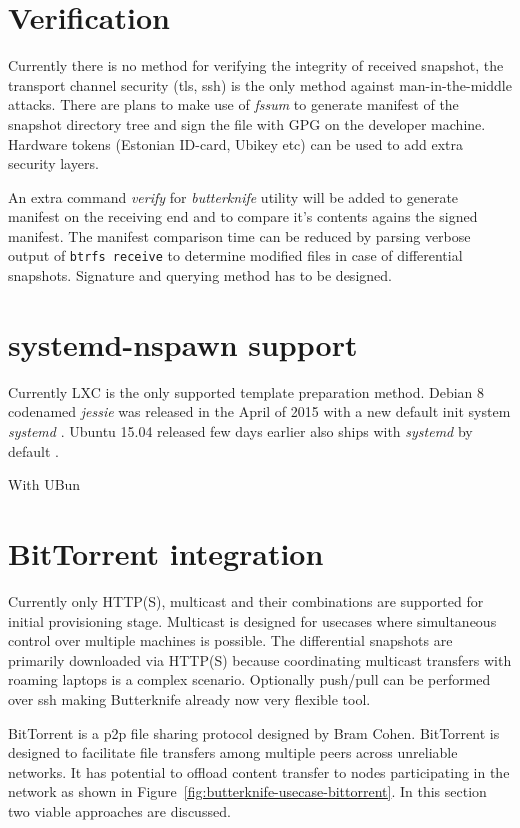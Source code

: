 \documentclass[a4paper,11pt]{kth-mag}
\begin{document}
\section{Verification}

Currently there is no method for verifying the integrity
of received snapshot, the transport channel security
(\acrshort{tls}, \acrshort{ssh}) is the only method against man-in-the-middle attacks.
There are plans to make use of \emph{fssum} to generate
manifest of the snapshot directory tree and
sign the file with GPG on the developer machine.
Hardware tokens (Estonian ID-card, Ubikey etc) can be used
to add extra security layers.

An extra command \emph{verify} for
\emph{butterknife} utility will be added
to generate manifest on the receiving end and
to compare it's contents agains the signed manifest.
The manifest comparison time can be reduced by
parsing verbose output of \lstinline!btrfs receive!
to determine modified files
in case of differential snapshots.
Signature and querying method has to be designed.

\section{systemd-nspawn support}

Currently LXC is the only supported template preparation method.
Debian 8 codenamed \emph{jessie} was released in the April of 2015
with a new default init system \emph{systemd}
\cite{debian-jessie-released}.
Ubuntu 15.04 released few days earlier also
ships with \emph{systemd} by default
\cite{ubuntu-vivid-vervet-released}.

With UBun

\section{BitTorrent integration}

Currently only HTTP(S), multicast and their combinations are supported
for initial provisioning stage.
Multicast is designed for usecases where simultaneous
control over multiple machines is possible.
The differential snapshots are primarily downloaded
via HTTP(S) because coordinating multicast
transfers with roaming laptops is a complex scenario.
Optionally push/pull can be performed over \acrshort{ssh}
making Butterknife already now very flexible tool.

BitTorrent is a \acrfull{p2p} file sharing protocol
designed by Bram Cohen. BitTorrent is designed to
facilitate file transfers among multiple peers
across unreliable networks.
It has potential to offload content transfer to nodes
participating in the network as shown in
Figure~\ref{fig:butterknife-usecase-bittorrent}.
In this section two viable approaches are discussed.
\end{document}
